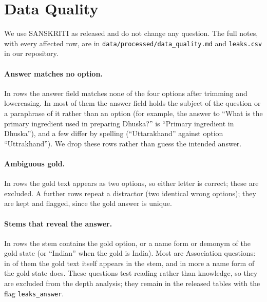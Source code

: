 \section{Data Quality}
\label{app:data}

We use SANSKRITI as released and do not change any question.
The full notes, with every affected row, are in \texttt{data/processed/data\_quality.md} and \texttt{leaks.csv} in our repository.

\begin{table}[h]
\centering\small

\caption{From the release to the analysis set.}
\label{tab:data}
\end{table}

\paragraph{Answer matches no option.}
In \nDropped{} rows the answer field matches none of the four options after trimming and lowercasing.
In most of them the answer field holds the subject of the question or a paraphrase of it rather than an option (for example, the answer to ``What is the primary ingredient used in preparing Dhuska?'' is ``Primary ingredient in Dhuska''), and a few differ by spelling (``Uttarakhand'' against option ``Uttrakhand'').
We drop these rows rather than guess the intended answer.

\paragraph{Ambiguous gold.}
In \nAmbiguous{} rows the gold text appears as two options, so either letter is correct; these are excluded.
A further \nDupOnly{} rows repeat a distractor (two identical wrong options); they are kept and flagged, since the gold answer is unique.

\paragraph{Stems that reveal the answer.}
In \nLeaks{} rows the stem contains the gold option, or a name form or demonym of the gold state (or ``Indian'' when the gold is India).
Most are Association questions: in \nAssocGoldText{} of them the gold text itself appears in the stem, and in \nAssocGoldStateName{} more a name form of the gold state does.
These questions test reading rather than knowledge, so they are excluded from the depth analysis; they remain in the released tables with the flag \texttt{leaks\_answer}.

